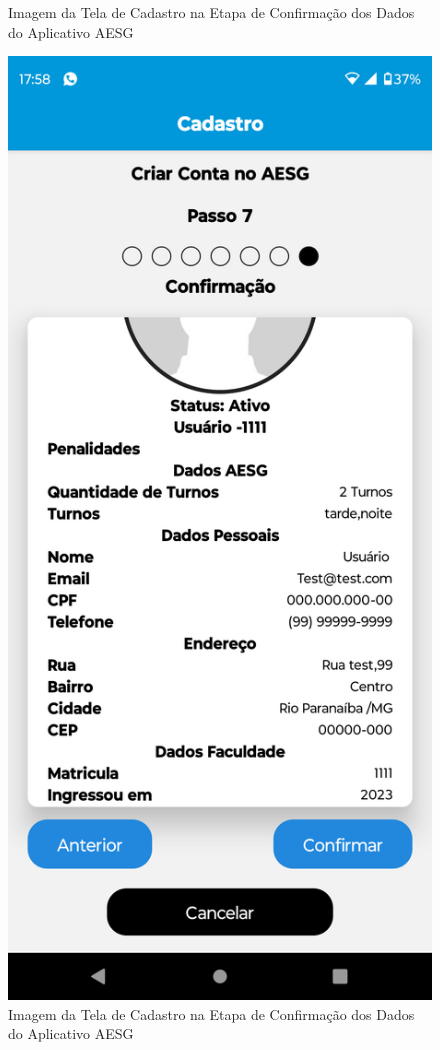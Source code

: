 \documentclass[
    12pt,                   %
    openright,              %
    oneside,                %
    a4paper,                %
    sumario=tradicional,    %
    english,                %
    brazil,                 %
    ]{abntex2}
\begin{document}
\begin{figure}[!h]
\begin{minipage}{0.5\textwidth}
                    \caption[Imagem da Tela de Cadastro na Etapa de Confirmação dos Dados do Aplicativo AESG]{ 
                    Imagem da Tela de Cadastro na Etapa de Confirmação dos Dados  do Aplicativo AESG}
                    \label{fig:AppTelaCadastroConf1}
                \end{minipage}%
                \begin{minipage}{0.5\textwidth}
                    \centering
                    \includegraphics[width=0.8\linewidth]{Imagens/App Images User/AUCadastroConf2.png}
                    \caption[Imagem da Tela de Cadastro na Etapa de Confirmação dos Dados do Aplicativo AESG]{ 
                    Imagem da Tela de Cadastro na Etapa de Confirmação dos Dados do Aplicativo AESG}
                    \label{fig:AppTelaCadastroConf2}
                \end{minipage}
            \end{figure}
        \newpage
\end{document}
